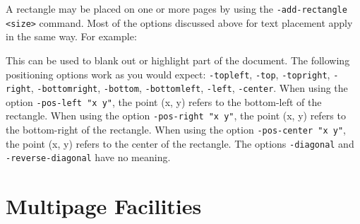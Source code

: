 \documentclass{book}
\begin{document}
A rectangle may be placed on one or more pages by using the \texttt{-add-rectangle <size>} command. Most of the options discussed above for text placement apply in the same way. For example:

\noindent{}

This can be used to blank out or highlight part of the document. The following positioning options work as you would expect: \texttt{-topleft}, \texttt{-top}, \texttt{-topright}, \texttt{-right}, \texttt{-bottomright}, \texttt{-bottom}, \texttt{-bottomleft}, \texttt{-left}, \texttt{-center}. When using the option \texttt{-pos-left "x y"}, the point (x, y) refers to the bottom-left of the rectangle. When using the option \texttt{-pos-right "x y"}, the point (x, y) refers to the bottom-right of the rectangle. When using the option \texttt{-pos-center "x y"}, the point (x, y) refers to the center of the rectangle. The options \texttt{-diagonal} and \texttt{-reverse-diagonal} have no meaning.\pagestyle{empty}\thispagestyle{fancy}



\chapter{Multipage Facilities}\pagestyle{fancy}
\noindent{}
\end{document}
